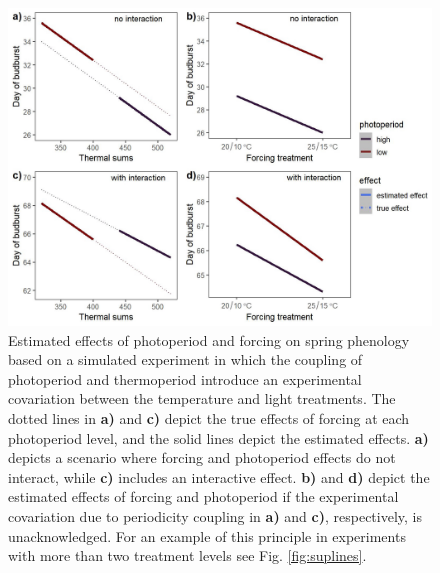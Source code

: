 \documentclass[11pt]{article}
\begin{document}
 \begin{figure}[h!]
    \centering
 \includegraphics[width=.8\textwidth]{..//Plots/periodicity_figures/apparent.jpeg}
    \caption{Estimated effects of photoperiod and forcing on spring phenology based on a simulated experiment in which the coupling of photoperiod and thermoperiod introduce an experimental covariation between the temperature and light treatments. The dotted lines in \textbf{a)} and \textbf{c)} depict the true effects of forcing at each photoperiod level, and the solid lines depict the estimated effects. \textbf{a)} depicts a scenario where forcing and photoperiod effects do not interact, while \textbf{c)} includes an interactive effect. \textbf{b)} and \textbf{d)} depict the estimated effects of forcing and photoperiod if the experimental covariation due to periodicity coupling in \textbf{a)} and \textbf{c)}, respectively, is unacknowledged. For an example of this principle in experiments with more than two treatment levels see Fig. \ref{fig:suplines}.}
    \label{fig:3d}
\end{figure}
 
\end{document}
